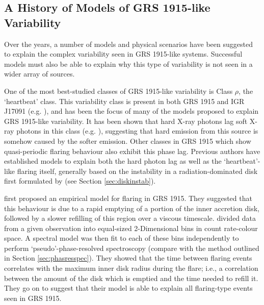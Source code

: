 \subsection{A History of Models of GRS 1915-like Variability}

\label{sec:models_GRS}

\par Over the years, a number of models and physical scenarios have been suggested to explain the complex variability seen in GRS 1915-like systems.  Successful models must also be able to explain why this type of variability is not seen in a wider array of sources.
\par One of the most best-studied classes of GRS 1915-like variability is Class $\rho$\indexrho, the `heartbeat' class.  This variability class is present in both GRS 1915 and IGR J17091 (e.g. \citealp{Altamirano_IGR_FH}), and has been the focus of many of the models proposed to explain GRS 1915-like variability.  It has been shown that hard X-ray photons lag soft X-ray photons in this class (e.g. \citealp{Janiuk_Lag,Massaro_Lag}), suggesting that hard emission from this source is somehow caused by the softer emission.  Other classes in GRS 1915 which show quasi-periodic flaring behaviour also exhibit this phase lag.  Previous authors have established models to explain both the hard photon lag as well as the `heartbeat'-like flaring itself, generally based on the instability in a radiation-dominated disk first formulated by \citet{Shakura_Instab} (see Section \ref{sec:diskinstab}).
\par \citet{Belloni_Model1} first proposed an empirical model for flaring in GRS 1915.  They suggested that this behaviour is due to a rapid emptying of a portion of the inner accretion disk, followed by a slower refilling of this region over a viscous timescale.  \citeauthor{Belloni_Model1} divided data from a given observation into equal-sized 2-Dimensional bins in count rate-colour space.  A spectral model was then fit to each of these bins independently to perform `pseudo'-phase-resolved spectroscopy (compare with the method outlined in Section \ref{sec:phasresspec}).  They showed that the time between flaring events correlates with the maximum inner disk radius during the flare; i.e., a correlation between the amount of the disk which is emptied and the time needed to refill it.  They go on to suggest that their model is able to explain all flaring-type events seen in GRS 1915.
